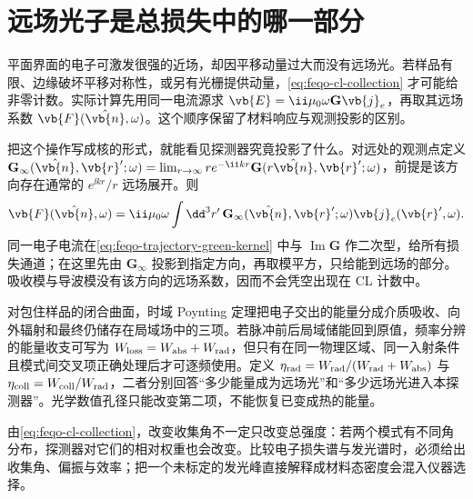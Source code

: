 \section{远场光子是总损失中的哪一部分}
\label{chap:feqo-cl}

平面界面的电子可激发很强的近场，却因平移动量过大而没有远场光。若样品有限、边缘破坏平移对称性，或另有光栅提供动量，\cref{eq:feqo-cl-collection} 才可能给非零计数。实际计算先用同一电流源求 \(\vb{E}=\ii\mu_0\omega\mathbf G\vb{j}_e\)，再取其远场系数 \(\vb{F}(\hat{\vb{n}},\omega)\)。这个顺序保留了材料响应与观测投影的区别。

把这个操作写成核的形式，就能看见探测器究竟投影了什么。对远处的观测点定义 \(\mathbf G_\infty(\hat{\vb{n}},\vb{r}';\omega)=\lim_{r\to\infty}r e^{-\ii kr}\mathbf G(r\hat{\vb{n}},\vb{r}';\omega)\)，前提是该方向存在通常的 \(e^{\ii kr}/r\) 远场展开。则
\[
\vb{F}(\hat{\vb{n}},\omega)
=\ii\mu_0\omega\int\dd^3r'\,
\mathbf G_\infty(\hat{\vb{n}},\vb{r}';\omega)
\vb{j}_e(\vb{r}',\omega).
\]
同一电子电流在\cref{eq:feqo-trajectory-green-kernel} 中与 \(\operatorname{Im}\mathbf G\) 作二次型，给所有损失通道；在这里先由 \(\mathbf G_\infty\) 投影到指定方向，再取模平方，只给能到远场的部分。吸收模与导波模没有该方向的远场系数，因而不会凭空出现在 CL 计数中。

对包住样品的闭合曲面，时域 Poynting 定理把电子交出的能量分成介质吸收、向外辐射和最终仍储存在局域场中的三项。若脉冲前后局域储能回到原值，频率分辨的能量收支可写为 \(W_{\rm loss}=W_{\rm abs}+W_{\rm rad}\)，但只有在同一物理区域、同一入射条件且模式间交叉项正确处理后才可逐频使用。定义 \(\eta_{\rm rad}=W_{\rm rad}/(W_{\rm rad}+W_{\rm abs})\) 与 \(\eta_{\rm coll}=W_{\rm coll}/W_{\rm rad}\)，二者分别回答“多少能量成为远场光”和“多少远场光进入本探测器”。光学数值孔径只能改变第二项，不能恢复已变成热的能量。

由\cref{eq:feqo-cl-collection}，改变收集角不一定只改变总强度：若两个模式有不同角分布，探测器对它们的相对权重也会改变。比较电子损失谱与发光谱时，必须给出收集角、偏振与效率；把一个未标定的发光峰直接解释成材料态密度会混入仪器选择。

